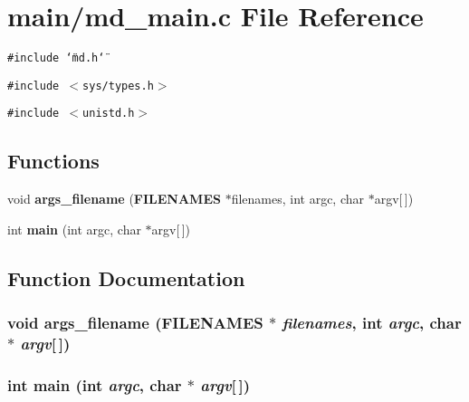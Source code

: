 \section{main/md\_\-main.c File Reference}
\label{md__main_8c}
{\tt \#include \char`\"{}md.h\char`\"{}}\par
{\tt \#include $<$sys/types.h$>$}\par
{\tt \#include $<$unistd.h$>$}\par
\subsection*{Functions}
\begin{CompactItemize}
\item 
void {\bf args\_\-filename} ({\bf FILENAMES} $\ast$filenames, int argc, char $\ast$argv[$\,$])
\item 
int {\bf main} (int argc, char $\ast$argv[$\,$])
\end{CompactItemize}


\subsection{Function Documentation}
\subsubsection{\setlength{\rightskip}{0pt plus 5cm}void args\_\-filename ({\bf FILENAMES} $\ast$ {\em filenames}, int {\em argc}, char $\ast$ {\em argv}[$\,$])}\label{md__main_8c_68388f1e3e2a32b952c457f64c3441b0}


\subsubsection{\setlength{\rightskip}{0pt plus 5cm}int main (int {\em argc}, char $\ast$ {\em argv}[$\,$])}\label{md__main_8c_0ddf1224851353fc92bfbff6f499fa97}


